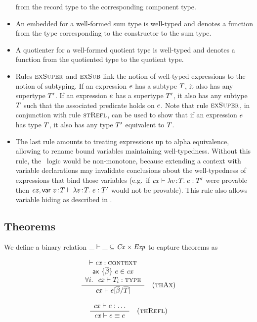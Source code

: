 \begin{itemize}
from the record type to the corresponding component type.
\item
An embedded for a well-formed sum type is well-typed and denotes a function
from the type corresponding to the constructor to the sum type.
\item
A quotienter for a well-formed quotient type is well-typed and denotes a
function from the quotiented type to the quotient type.
\item
Rules $\textsc{exSuper}$ and $\textsc{exSub}$ link the notion of well-typed expressions to the
notion of subtyping. If an expression $e$ has a subtype $T$, it also
has any supertype $T'$. If an expression $e$ has a supertype $T'$,
it also has any subtype $T$ such that the associated predicate holds on
$e$. Note that rule $\textsc{exSuper}$, in conjunction with rule $\textsc{stRefl}$, can
be used to show that if an expression $e$ has type $T$, it also has any
type $T'$ equivalent to $T$.
\item
The last rule amounts to treating expressions up to alpha equivalence,
allowing to rename bound variables maintaining well-typedness. Without this
rule, the \MS\ logic would be non-monotone, because extending a context with
variable declarations may invalidate conclusions about the well-typedness of
expressions that bind those variables (e.g.\ if $\mathit{cx}\vdash\lambda v\!:\!T.\;e:T'$ were
provable then $\mathit{cx},\mathsf{var}\ v\!:\!T\vdash\lambda v\!:\!T.\;e:T'$ would not be
provable). This rule also allows variable hiding as described in \cite{lm}.
\end{itemize}

\subsection{Theorems}

We define a binary relation $\_\vdash\_\subseteq\mathit{Cx}\times\mathit{Exp}$ to capture theorems
as

\[
\frac{\begin{array}{c}\vdash\mathit{cx}:\textsc{context}\\\mathsf{ax}\ \{\overline{\beta}\}\ e\in\mathit{cx}\\\forall i.\ \ \mathit{cx}\vdash T_i:\textsc{type}\end{array}}{\mathit{cx}\vdash e[\overline{\beta}/\overline{T}]}\quad\mbox{(\textsc{thAx})}
\]


\[
\frac{\begin{array}{c}\mathit{cx}\vdash e:\ldots\end{array}}{\mathit{cx}\vdash e\equiv e}\quad\mbox{(\textsc{thRefl})}
\]

